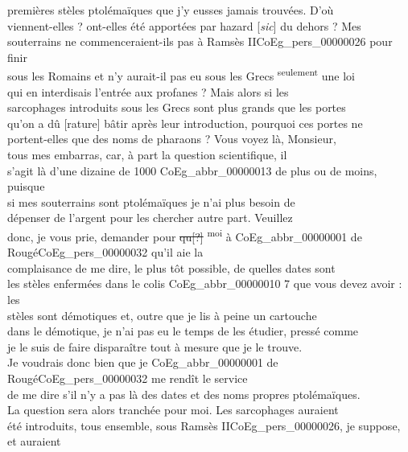 \documentclass{book}
\begin{document}
\noindent premières stèles ptolémaïques que j’y eusses jamais trouvées. D’où\\
viennent-elles ? ont-elles été apportées par hazard {[\textit{sic}]} du dehors ? Mes\\
souterrains ne commenceraient-ils pas à Ramsès II\gls{CoEg_pers_00000026} pour finir\\
sous les Romains et n’y aurait-il pas eu sous les Grecs \textsuperscript{seulement} une loi\\
qui en interdisais l’entrée aux profanes ? Mais alors si les\\
sarcophages introduits sous les Grecs sont plus grands que les portes\\
qu’on a dû [rature] bâtir après leur introduction, pourquoi ces portes ne\\
portent-elles que des noms de pharaons ? Vous voyez là, Monsieur,\\
tous mes embarras, car, à part la question scientifique, il\\
s’agit là d’une dizaine de 1000 \gls{CoEg_abbr_00000013} de plus ou de moins, puisque\\
si mes souterrains sont ptolémaïques je n’ai plus besoin de\\
dépenser de l’argent pour les chercher autre part. Veuillez\\
donc, je vous prie, demander pour \sout{qu{[?]}} \textsuperscript{moi} à \gls{CoEg_abbr_00000001} de Rougé\gls{CoEg_pers_00000032} qu’il aie la\\
complaisance de me dire, le plus tôt possible, de quelles dates sont\\
les stèles enfermées dans le colis \gls{CoEg_abbr_00000010} 7 que vous devez avoir : les\\
stèles sont démotiques et, outre que je lis à peine un cartouche\\
dans le démotique, je n’ai pas eu le temps de les étudier, pressé comme\\
je le suis de faire disparaître tout à mesure que je le trouve.\\
Je voudrais donc bien que je \gls{CoEg_abbr_00000001} de Rougé\gls{CoEg_pers_00000032} me rendît le service\\
de me dire s’il n’y a pas là des dates et des noms propres ptolémaïques.\\
La question sera alors tranchée pour moi. Les sarcophages auraient\\
été introduits, tous ensemble, sous Ramsès II\gls{CoEg_pers_00000026}, je suppose, et auraient\\
\end{document}
